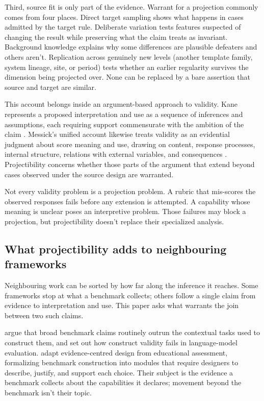 \documentclass[12pt]{article}
\begin{document}
Third, source fit is only part of the evidence. Warrant for a projection commonly comes from four places. Direct target sampling shows what happens in cases admitted by the target rule. Deliberate variation tests features suspected of changing the result while preserving what the claim treats as invariant. Background knowledge explains why some differences are plausible defeaters and others aren't. Replication across genuinely new levels (another template family, system lineage, site, or period) tests whether an earlier regularity survives the dimension being projected over. None can be replaced by a bare assertion that source and target are similar.

This account belongs inside an argument-based approach to validity. Kane represents a proposed interpretation and use as a sequence of inferences and assumptions, each requiring support commensurate with the ambition of the claim \citep[1--3, 22--25]{kane2013validating}. Messick's unified account likewise treats validity as an evidential judgment about score meaning and use, drawing on content, response processes, internal structure, relations with external variables, and consequences \citep[741--749]{messick1995Validity}. Projectibility concerns whether those parts of the argument that extend beyond cases observed under the source design are warranted.

Not every validity problem is a projection problem. A rubric that mis-scores the observed responses fails before any extension is attempted. A capability whose meaning is unclear poses an interpretive problem. Those failures may block a projection, but projectibility doesn't replace their specialized analysis.

\subsection{What projectibility adds to neighbouring frameworks}\label{ssec:neighbours}

Neighbouring work can be sorted by how far along the inference it reaches. Some frameworks stop at what a benchmark collects; others follow a single claim from evidence to interpretation and use. This paper asks what warrants the join between two such claims.

\Textcite{raji2021whole} argue that broad benchmark claims routinely outrun the contextual tasks used to construct them, and \Textcite{bowmanDahl2021benchmarking} set out how construct validity fails in language-model evaluation. \Textcite{liu2024ecbd} adapt evidence-centred design from educational assessment, formalizing benchmark construction into modules that require designers to describe, justify, and support each choice. Their subject is the evidence a benchmark collects about the capabilities it declares; movement beyond the benchmark isn't their topic.
\end{document}
